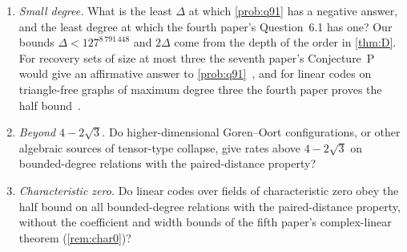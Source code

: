 \begin{enumerate}[label=(\arabic*)]
\item \emph{Small degree.} What is the least $\Delta$ at which \cref{prob:q91} has a negative answer, and the least
degree at which the fourth paper's Question~6.1 has one? Our bounds $\Delta<127^{8\,791\,448}$ and $2\Delta$ come from the depth
of the order in \cref{thm:D}. For recovery sets of size at most three the seventh paper's Conjecture~P would give an
affirmative answer to \cref{prob:q91}~\cite{NestedElimination2026}, and for linear codes on triangle-free graphs of
maximum degree three the fourth paper proves the half bound~\cite[Theorem~6.13]{CurvedMotion2026}.
\item \emph{Beyond $4-2\sqrt3$.} Do higher-dimensional Goren--Oort configurations, or other algebraic sources of
tensor-type collapse, give rates above $4-2\sqrt3$ on bounded-degree relations with the paired-distance property?
\item \emph{Characteristic zero.} Do linear codes over fields of characteristic zero obey the half bound on all
bounded-degree relations with the paired-distance property, without the coefficient and width bounds of the fifth paper's
complex-linear theorem (\cref{rem:char0})?
\end{enumerate}
